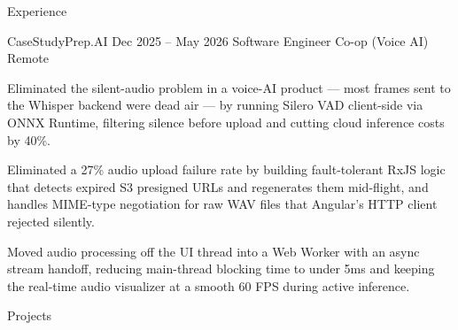 \documentclass[
	11pt
]{../template}
\begin{document}
\begin{rSection}{E}{xperience}
		\begin{rSectionEntry}
			{CaseStudyPrep.AI}
			{Dec 2025 -- May 2026}
			{Software Engineer Co-op (Voice AI)}
			{}
			{Remote}

			\item Eliminated the silent-audio problem in a voice-AI product --- most frames sent to the Whisper backend were dead air --- by running Silero VAD client-side via ONNX Runtime, filtering silence before upload and cutting cloud inference costs by 40\%.
			\item Eliminated a 27\% audio upload failure rate by building fault-tolerant RxJS logic that detects expired S3 presigned URLs and regenerates them mid-flight, and handles MIME-type negotiation for raw WAV files that Angular's HTTP client rejected silently.
			\item Moved audio processing off the UI thread into a Web Worker with an async stream handoff, reducing main-thread blocking time to under 5ms and keeping the real-time audio visualizer at a smooth 60 FPS during active inference.
		\end{rSectionEntry}
	\end{rSection}

	\begin{rSection}{P}{rojects}
	\end{rSection}
\end{document}
